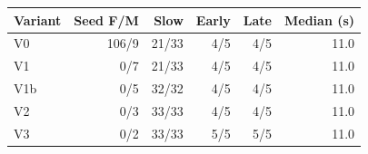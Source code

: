 \begin{tabular}{@{}lrrrrr@{}}\toprule
Variant & Seed F/M & Slow & Early & Late & Median (s)\\\midrule
V0 & 106/9 & 21/33 & 4/5 & 4/5 & 11.0\\
V1 & 0/7 & 21/33 & 4/5 & 4/5 & 11.0\\
V1b & 0/5 & 32/32 & 4/5 & 4/5 & 11.0\\
V2 & 0/3 & 33/33 & 4/5 & 4/5 & 11.0\\
V3 & 0/2 & 33/33 & 5/5 & 5/5 & 11.0\\
\bottomrule\end{tabular}
